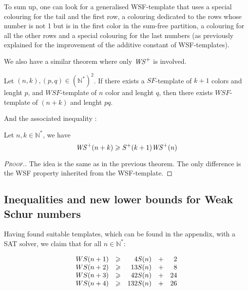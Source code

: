 \par
To sum up, one can look for a generalised WSF-template that uses a special colouring for the tail and the first row, a
colouring dedicated to the rows whose number is not 1 but is in the first color in the sum-free partition, a colouring for all
the other rows and a special colouring for the last numbers (as previously explained for the improvement of the additive
constant of WSF-templates).

We also have a similar theorem where only \(\mathit{WS}^+\) is involved.

\begin{theorem}
	Let \((n,k), (p,q) \in (\mathbb{N}^*)^2\). If there exists a \(SF\)-template of \(k+1\) colors and lenght \(p\),
	and \(WSF\)-template of \(n\) color and lenght \(q\), then there exists \(WSF\)-template of \((n+k)\) and lenght \(pq\).
\end{theorem}

And the associated inequality :

\begin{corollary}
	Let \(n, k \in \mathbb{N}^*\), we have \\
	\[ \mathit{WS}^+(n+k) \geqslant S^+(k+1) \mathit{WS}^+(n) \]
\end{corollary}

\begin{proof}[\textsc{Proof.}]
The idea is the same as in the previous theorem. The only difference is the WSF property inherited
from the WSF-template.
\end{proof}



\subsection{Inequalities and new lower bounds for Weak Schur numbers}

\qquad Having found suitable templates, which can be found in the appendix, with a SAT solver, we claim that for all \(n \in
\mathbb{N}^*\):

\[
\begin{array}{r r r r r}
	WS(n + 1) & \geqslant & 4 S(n) & + & 2 \\
	WS(n + 2) & \geqslant & 13 S(n) & + & 8 \\
	WS(n + 3) & \geqslant & 42 S(n) & + & 24 \\
	WS(n + 4) & \geqslant & 132 S(n) & + & 26 \\
\end{array}
\]

